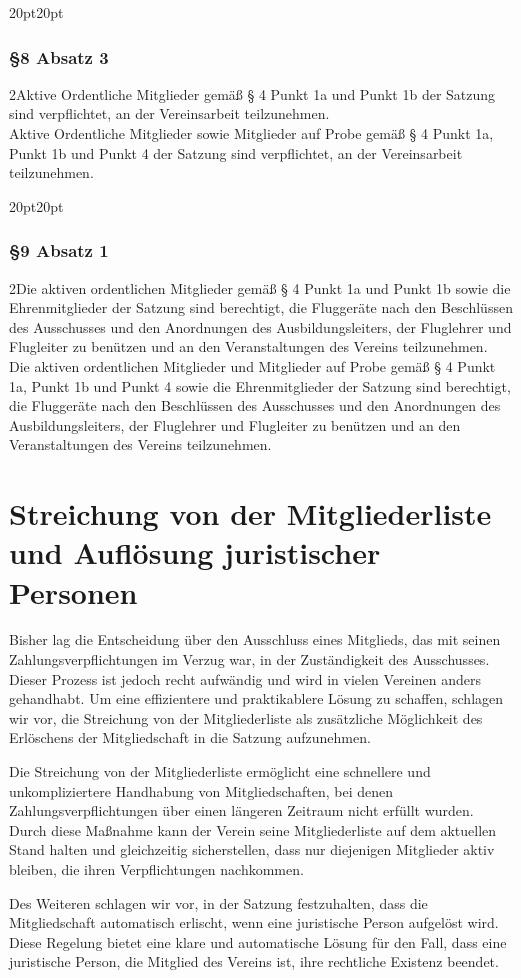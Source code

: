 \documentclass[10pt,a4paper,parskip=half]{scrartcl}
\newcommand{\change}[1]{
  \begin{adjustwidth}{20pt}{20pt}
    #1
  \end{adjustwidth}
}
\newcommand{\compare}[3]{\change{\subsubsection*{#1}\begin{multicols}{2}#2\columnbreak\\#3\end{multicols}}}
\begin{document}
  \clearpage
  \compare{§8 Absatz 3}
  {Aktive Ordentliche Mitglieder gemäß § 4 Punkt 1a und Punkt 1b der Satzung sind verpflichtet, an der Vereinsarbeit teilzunehmen.}
  {Aktive Ordentliche Mitglieder sowie Mitglieder auf Probe gemäß § 4 Punkt 1a, Punkt 1b und Punkt 4 der Satzung sind verpflichtet, an der Vereinsarbeit teilzunehmen.}

\compare{§9 Absatz 1}
{Die aktiven ordentlichen Mitglieder gemäß § 4 Punkt 1a und Punkt 1b sowie die Ehrenmitglieder der Satzung sind berechtigt, die Fluggeräte nach den Beschlüssen des Ausschusses und den Anordnungen des Ausbildungsleiters, der Fluglehrer und Flugleiter zu benützen und an den Veranstaltungen des Vereins teilzunehmen.}
{Die aktiven ordentlichen Mitglieder und Mitglieder auf Probe gemäß § 4 Punkt 1a, Punkt 1b und Punkt 4 sowie die Ehrenmitglieder der Satzung sind berechtigt, die Fluggeräte nach den Beschlüssen des Ausschusses und den Anordnungen des Ausbildungsleiters, der Fluglehrer und Flugleiter zu benützen und an den Veranstaltungen des Vereins teilzunehmen.}
    
  \section{Streichung von der Mitgliederliste und Auflösung juristischer Personen}
  Bisher lag die Entscheidung über den Ausschluss eines Mitglieds, das mit seinen Zahlungsverpflichtungen im Verzug war, in der Zuständigkeit des Ausschusses. Dieser Prozess ist jedoch recht aufwändig und wird in vielen Vereinen anders gehandhabt. Um eine effizientere und praktikablere Lösung zu schaffen, schlagen wir vor, die Streichung von der Mitgliederliste als zusätzliche Möglichkeit des Erlöschens der Mitgliedschaft in die Satzung aufzunehmen.

  Die Streichung von der Mitgliederliste ermöglicht eine schnellere und unkompliziertere Handhabung von Mitgliedschaften, bei denen Zahlungsverpflichtungen über einen längeren Zeitraum nicht erfüllt wurden. Durch diese Maßnahme kann der Verein seine Mitgliederliste auf dem aktuellen Stand halten und gleichzeitig sicherstellen, dass nur diejenigen Mitglieder aktiv bleiben, die ihren Verpflichtungen nachkommen.

  Des Weiteren schlagen wir vor, in der Satzung festzuhalten, dass die Mitgliedschaft automatisch erlischt, wenn eine juristische Person aufgelöst wird. Diese Regelung bietet eine klare und automatische Lösung für den Fall, dass eine juristische Person, die Mitglied des Vereins ist, ihre rechtliche Existenz beendet.
\end{document}
